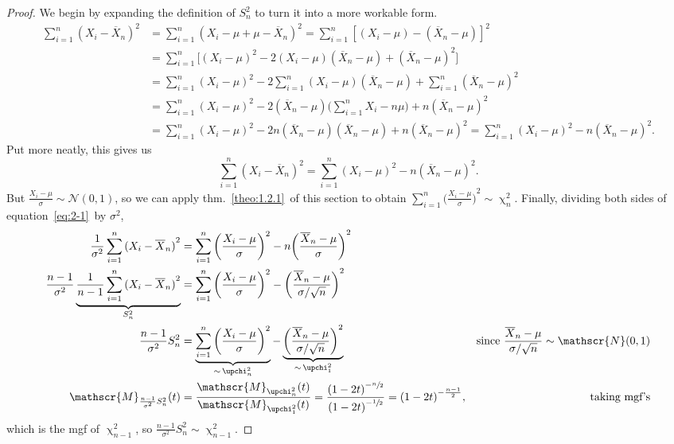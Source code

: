 \begin{proof}
    We begin by expanding the definition of \(S_n^2\) to turn it into a more workable form.\begin{align*}
        \sum_{i=1}^n {(X_i - \overline{X}_n)}^2 &= \sum_{i=1}^n {(X_i - \mu + \mu - \overline{X}_n)}^2 = \sum_{i=1}^n {[(X_i - \mu) - (\overline{X}_n -\mu)]}^2 \\ 
        &= \sum_{i=1}^n \big[{(X_i -\mu)}^2  - 2(X_i - \mu)(\overline{X}_n -\mu) + {(\overline{X}_n - \mu)}^2\big] \\ 
        &= \sum_{i=1}^n {(X_i -\mu)}^2 - 2 \sum_{i=1}^n (X_i - \mu)(\overline{X}_n -\mu) + \sum_{i=1}^n {(\overline{X}_n - \mu)}^2 \\ 
        &= \sum_{i=1}^n {(X_i -\mu)}^2 - 2(\overline{X}_n - \mu )\bigg(\sum_{i=1}^{n} X_i - n\mu\bigg) + n{(\overline{X}_n -\mu)}^2 \\ 
        &= \sum_{i=1}^n {(X_i -\mu)}^2 - 2n(\overline{X}_n - \mu )(\overline{X}_n - \mu ) + n{(\overline{X}_n -\mu)}^2 =  \sum_{i=1}^n {(X_i -\mu)}^2 - n{(\overline{X}_n -\mu)}^2.
    \end{align*}Put more neatly, this gives us\begin{equation}\label{eq:2-1}
         \sum_{i=1}^n  {(X_i - \overline{X}_n)}^2 = \sum_{i=1}^n {(X_i - \mu)}^2 - n{(\overline{X}_n - \mu)}^2.
    \end{equation} 
    But \(\frac{X_i - \mu}{\sigma} \sim \mathscr{N}(0,1)\), so we can apply thm.~\ref{theo:1.2.1}~of this section to obtain \(
    \sum_{i=1}^n {\big(\frac{X_i - \mu}{\sigma}\big)}^2 \sim \upchi_n^2
    \). Finally, dividing both sides of equation~\ref{eq:2-1}~by \(\sigma^2\),\begin{align*}
        \frac{1}{\sigma^2}\sum_{i=1}^{n} {(X_i - \overline{X}_n)}^2&=  \sum_{i=1}^n {\bigg(\frac{X_i -\mu}{\sigma}\bigg)}^2 - n{\bigg(\frac{\overline{X}_n -\mu}{\sigma}\bigg)}^2 \\ 
        \frac{n-1}{\sigma^2} \underbrace{\frac{1}{n-1}\sum_{i=1}^{n} {(X_i - \overline{X}_n)}^2}_{S_n^2}&=  \sum_{i=1}^n {\bigg(\frac{X_i -\mu}{\sigma}\bigg)}^2- {\bigg(\frac{\overline{X}_n -\mu}{\sigma/\sqrt{n}}\bigg)}^2 \\ 
        \frac{n-1}{\sigma^2} S_n^2 &= \underbrace{\sum_{i=1}^n {\bigg(\frac{X_i -\mu}{\sigma}\bigg)}^2}_{\sim\,\upchi_n^2}  -  \underbrace{{\bigg(\frac{\overline{X}_n -\mu}{\sigma/\sqrt{n}}\bigg)}^2}_{\sim\,\upchi_1^2} &\text{since}~\frac{\overline{X}_n - \mu}{\sigma/\sqrt{n}}\sim \mathscr{N}(0,1) \\ 
        \mathscr{M}_{\frac{n-1}{\sigma^2}S_n^2}(t) & = \frac{\mathscr{M}_{\upchi_n^2}(t)}{\mathscr{M}_{\upchi_1^2}(t)} = \frac{{(1-2t)}^{-\sfrac{n}{2}}}{{(1-2t)}^{-\sfrac{1}{2}}} = {(1-2t)}^{-\frac{n-1}{2}}, &\text{taking mgf's}
    \end{align*}which is the mgf of \(\upchi_{n-1}^2\), so \(\frac{n-1}{\sigma^2}S_n^2 \sim \upchi_{n-1}^2\). 
\end{proof}

